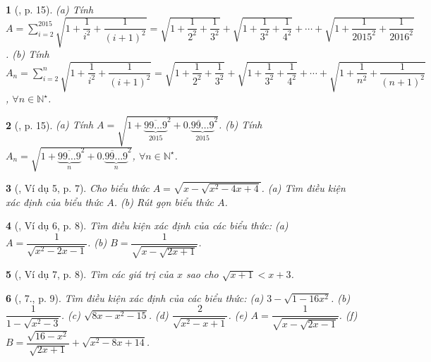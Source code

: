 \documentclass{article}
\newtheorem{baitoan}{}%
\begin{document}
\begin{baitoan}[\cite{Binh_boi_duong_Toan_9_tap_1}, p. 15]
	(a) Tính $A = \sum_{i=2}^{2015} \sqrt{1 + \dfrac{1}{i^2} + \dfrac{1}{(i + 1)^2}} = \sqrt{1 + \dfrac{1}{2^2} + \dfrac{1}{3^2}} + \sqrt{1 + \dfrac{1}{3^2} + \dfrac{1}{4^2}} + \cdots + \sqrt{1 + \dfrac{1}{2015^2} + \dfrac{1}{2016^2}}$. (b) Tính $A_n = \sum_{i=2}^n \sqrt{1 + \dfrac{1}{i^2} + \dfrac{1}{(i + 1)^2}} = \sqrt{1 + \dfrac{1}{2^2} + \dfrac{1}{3^2}} + \sqrt{1 + \dfrac{1}{3^2} + \dfrac{1}{4^2}} + \cdots + \sqrt{1 + \dfrac{1}{n^2} + \dfrac{1}{(n + 1)^2}}$, $\forall n\in\mathbb{N}^\star$.
\end{baitoan}

\begin{baitoan}[\cite{Binh_boi_duong_Toan_9_tap_1}, p. 15]
	(a) Tính $A = \sqrt{1 + \overline{\underbrace{99\ldots9}_{2015}}^2 + \overline{0.\underbrace{99\ldots9}_{2015}}^2}$. (b) Tính $A_n = \sqrt{1 + \overline{\underbrace{99\ldots9}_n}^2 + \overline{0.\underbrace{99\ldots9}_n}^2}$, $\forall n\in\mathbb{N}^\star$.
\end{baitoan}


\begin{baitoan}[\cite{Binh_Toan_9_tap_1}, Ví dụ 5, p. 7]
	Cho biểu thức $A = \sqrt{x - \sqrt{x^2 - 4x + 4}}$. (a) Tìm điều kiện xác định của biểu thức $A$. (b) Rút gọn biểu thức $A$.
\end{baitoan}

\begin{baitoan}[\cite{Binh_Toan_9_tap_1}, Ví dụ 6, p. 8]
	Tìm điều kiện xác định của các biểu thức: (a) $A = \dfrac{1}{\sqrt{x^2 - 2x - 1}}$. (b) $B = \dfrac{1}{\sqrt{x - \sqrt{2x + 1}}}$.
\end{baitoan}

\begin{baitoan}[\cite{Binh_Toan_9_tap_1}, Ví dụ 7, p. 8]
	Tìm các giá trị của $x$ sao cho $\sqrt{x + 1} < x + 3$.
\end{baitoan}

\begin{baitoan}[\cite{Binh_Toan_9_tap_1}, 7., p. 9]
	Tìm điều kiện xác định của các biểu thức: (a) $3 - \sqrt{1 - 16x^2}$. (b) $\dfrac{1}{1 - \sqrt{x^2 - 3}}$. (c) $\sqrt{8x - x^2 - 15}$. (d) $\dfrac{2}{\sqrt{x^2 - x + 1}}$. (e) $A = \dfrac{1}{\sqrt{x - \sqrt{2x - 1}}}$. (f) $B = \dfrac{\sqrt{16 - x^2}}{\sqrt{2x + 1}} + \sqrt{x^2 - 8x + 14}$.
\end{baitoan}
\end{document}
